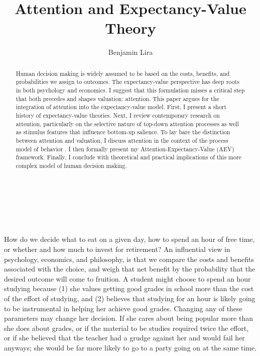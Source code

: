 \documentclass[letterpaper, 12pt]{article}
\title{Attention and Expectancy-Value Theory}
\author{Benjamin Lira}
\makeatletter
\renewcommand\maketitle{
{\raggedright %
\begin{center}
{\huge \bfseries \sffamily \@title }\\[1ex] 
{\large \bfseries \scshape \sffamily \@author}\\[1ex] 
\bfseries \sffamily \@date\\[4ex]
\end{center}}} %
\makeatother
\begin{document}
\maketitle

\begin{abstract}
Human decision making is widely assumed to be based on the costs, benefits, and probabilities we assign to outcomes. The expectancy-value perspective has deep roots in both psychology and economics. I suggest that this formulation misses a critical step that both precedes and shapes valuation: attention. This paper argues for the integration of attention into the expectancy-value model. First, I present a short history of expectancy-value theories. Next, I review contemporary research on attention, particularly on the selective nature of top-down attention processes as well as stimulus features that influence bottom-up salience. To lay bare the distinction between attention and valuation, I discuss attention in the context of the process model of behavior \cite{duckworth2020}. I then formally present my Attention-Expectancy-Value (AEV) framework. Finally, I conclude with theoretical and practical implications of this more complex model of human decision making.
    
\end{abstract}
\linenumbers

How do we decide what to eat on a given day, how to spend an hour of free time, or whether and how much to invest for retirement? An influential view in psychology, economics, and philosophy, is that we compare the costs and benefits associated with the choice, and weigh that net benefit by the probability that the desired outcome will come to fruition. A student might choose to spend an hour studying because (1) she values getting good grades in school more than the cost of the effort of studying, and (2) believes that studying for an hour is likely going to be instrumental in helping her achieve good grades. Changing any of these parameters may change her decision. If she cares about being popular more than she does about grades, or if the material to be studies required twice the effort, or if she believed that the teacher had a grudge against her and would fail her anyways; she would be far more likely to go to a party going on at the same time.
\end{document}
